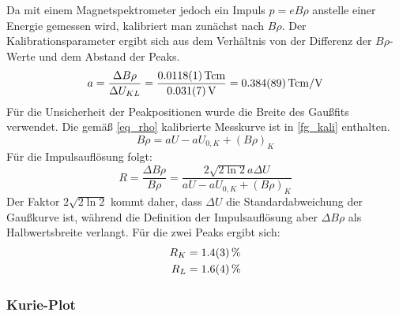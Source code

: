 \documentclass[
	a4paper,
	12pt,
	pagesize,
	ngerman
]{scrartcl}
\begin{document}
	Da mit einem Magnetspektrometer jedoch ein Impuls $p=eB\rho$ anstelle einer Energie gemessen wird, kalibriert man zunächst nach $B\rho$.
	Der Kalibrationsparameter ergibt sich aus dem Verhältnis von der Differenz der $B\rho$-Werte und dem Abstand der Peaks.
	\begin{equation}
		a = \frac{\Delta B\rho}{\Delta U_{KL}} = \frac{\SI{0.0118+-0.0001}{Tcm}}{\SI{0.031+-0.007}{V}} = \SI{0.384+-0.089}{Tcm/V}
	\end{equation}
	Für die Unsicherheit der Peakpositionen wurde die Breite des Gaußfits verwendet.
	Die gemäß \cref{eq_rho} kalibrierte Messkurve ist in \cref{fg_kali} enthalten.
	\begin{equation}
		\label{eq_rho}
		B\rho = aU-aU_{0,K}+(B\rho)_K
	\end{equation}
		Für die Impulsauflösung folgt:
	\begin{equation}
		R = \frac{\Delta B \rho}{B\rho} = \frac{2\sqrt{2\ln2}a\Delta U}{aU-aU_{0,K}+(B\rho)_K}
	\end{equation}
	Der Faktor $2\sqrt{2\ln2}$ kommt daher, dass $\Delta U$ die Standardabweichung der Gaußkurve ist, während die Definition der Impulsauflösung aber $\Delta B\rho$ als Halbwertsbreite verlangt.
	Für die zwei Peaks ergibt sich:
	\begin{align}
	R_K&= \SI{1.4+- 0.3}{\percent} \\
	R_L&= \SI{1.6+-0.4}{\percent}
	\end{align}

	\subsubsection{Kurie-Plot}
\end{document}
